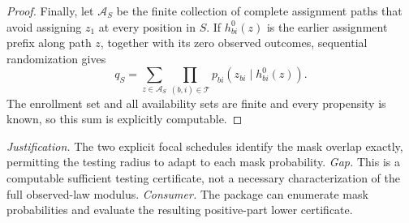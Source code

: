 \documentclass{article}
\begin{document}
\begin{proof}
Finally, let \(\mathcal A_S\) be the finite collection of complete assignment paths that avoid assigning \(z_1\) at every position in \(S\).  If \(h^0_{bi}(z)\) is the earlier assignment prefix along path \(z\), together with its zero observed outcomes, sequential randomization gives
\[
 q_S
 =\sum_{z\in\mathcal A_S}
   \prod_{(b,i)\in\mathcal T}
   p_{bi}(z_{bi}\mid h^0_{bi}(z)).
\]
The enrollment set and all availability sets are finite and every propensity is known, so this sum is explicitly computable.
\end{proof}
\par\smallskip\noindent \textit{Justification.} The two explicit focal schedules identify the mask overlap exactly, permitting the testing radius to adapt to each mask probability. \textit{Gap.} This is a computable sufficient testing certificate, not a necessary characterization of the full observed-law modulus. \textit{Consumer.} The package can enumerate mask probabilities and evaluate the resulting positive-part lower certificate.
\end{document}
